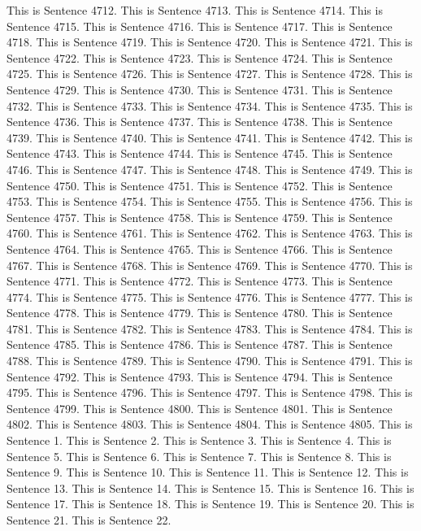 \documentclass{article}
\begin{document}
This is Sentence 4712.
This is Sentence 4713.
This is Sentence 4714.
This is Sentence 4715.
This is Sentence 4716.
This is Sentence 4717.
This is Sentence 4718.
This is Sentence 4719.
This is Sentence 4720.
This is Sentence 4721.
This is Sentence 4722.
This is Sentence 4723.
This is Sentence 4724.
This is Sentence 4725.
This is Sentence 4726.
This is Sentence 4727.
This is Sentence 4728.
This is Sentence 4729.
This is Sentence 4730.
This is Sentence 4731.
This is Sentence 4732.
This is Sentence 4733.
This is Sentence 4734.
This is Sentence 4735.
This is Sentence 4736.
This is Sentence 4737.
This is Sentence 4738.
This is Sentence 4739.
This is Sentence 4740.
This is Sentence 4741.
This is Sentence 4742.
This is Sentence 4743.
This is Sentence 4744.
This is Sentence 4745.
This is Sentence 4746.
This is Sentence 4747.
This is Sentence 4748.
This is Sentence 4749.
This is Sentence 4750.
This is Sentence 4751.
This is Sentence 4752.
This is Sentence 4753.
This is Sentence 4754.
This is Sentence 4755.
This is Sentence 4756.
This is Sentence 4757.
This is Sentence 4758.
This is Sentence 4759.
This is Sentence 4760.
This is Sentence 4761.
This is Sentence 4762.
This is Sentence 4763.
This is Sentence 4764.
This is Sentence 4765.
This is Sentence 4766.
This is Sentence 4767.
This is Sentence 4768.
This is Sentence 4769.
This is Sentence 4770.
This is Sentence 4771.
This is Sentence 4772.
This is Sentence 4773.
This is Sentence 4774.
This is Sentence 4775.
This is Sentence 4776.
This is Sentence 4777.
This is Sentence 4778.
This is Sentence 4779.
This is Sentence 4780.
This is Sentence 4781.
This is Sentence 4782.
This is Sentence 4783.
This is Sentence 4784.
This is Sentence 4785.
This is Sentence 4786.
This is Sentence 4787.
This is Sentence 4788.
This is Sentence 4789.
This is Sentence 4790.
This is Sentence 4791.
This is Sentence 4792.
This is Sentence 4793.
This is Sentence 4794.
This is Sentence 4795.
This is Sentence 4796.
This is Sentence 4797.
This is Sentence 4798.
This is Sentence 4799.
This is Sentence 4800.
This is Sentence 4801.
This is Sentence 4802.
This is Sentence 4803.
This is Sentence 4804.
This is Sentence 4805.
This is Sentence 1.
This is Sentence 2.
This is Sentence 3.
This is Sentence 4.
This is Sentence 5.
This is Sentence 6.
This is Sentence 7.
This is Sentence 8.
This is Sentence 9.
This is Sentence 10.
This is Sentence 11.
This is Sentence 12.
This is Sentence 13.
This is Sentence 14.
This is Sentence 15.
This is Sentence 16.
This is Sentence 17.
This is Sentence 18.
This is Sentence 19.
This is Sentence 20.
This is Sentence 21.
This is Sentence 22.
\end{document}
